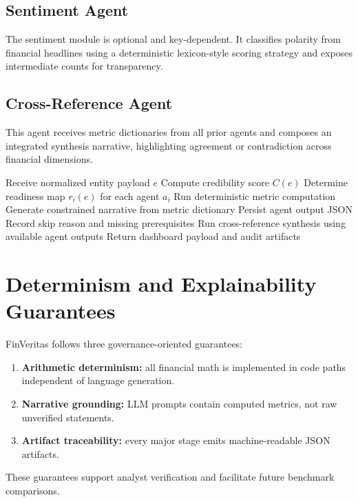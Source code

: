\documentclass[conference]{IEEEtran}
\begin{document}
\subsection{Sentiment Agent}
The sentiment module is optional and key-dependent. It classifies polarity from financial headlines using a deterministic lexicon-style scoring strategy and exposes intermediate counts for transparency.

\subsection{Cross-Reference Agent}
This agent receives metric dictionaries from all prior agents and composes an integrated synthesis narrative, highlighting agreement or contradiction across financial dimensions.

\begin{algorithm}
\caption{Readiness-Gated Multi-Agent Execution}
\begin{algorithmic}[1]
\STATE Receive normalized entity payload $e$
\STATE Compute credibility score $C(e)$
\STATE Determine readiness map $r_i(e)$ for each agent $a_i$
        \STATE Run deterministic metric computation
        \STATE Generate constrained narrative from metric dictionary
        \STATE Persist agent output JSON
    \ELSE
        \STATE Record skip reason and missing prerequisites
    \ENDIF
\ENDFOR
\STATE Run cross-reference synthesis using available agent outputs
\STATE Return dashboard payload and audit artifacts
\end{algorithmic}
\label{alg:orchestration}
\end{algorithm}

\section{Determinism and Explainability Guarantees}
FinVeritas follows three governance-oriented guarantees:
\begin{enumerate}
    \item \textbf{Arithmetic determinism:} all financial math is implemented in code paths independent of language generation.
    \item \textbf{Narrative grounding:} LLM prompts contain computed metrics, not raw unverified statements.
    \item \textbf{Artifact traceability:} every major stage emits machine-readable JSON artifacts.
\end{enumerate}
These guarantees support analyst verification and facilitate future benchmark comparisons.
\end{document}
